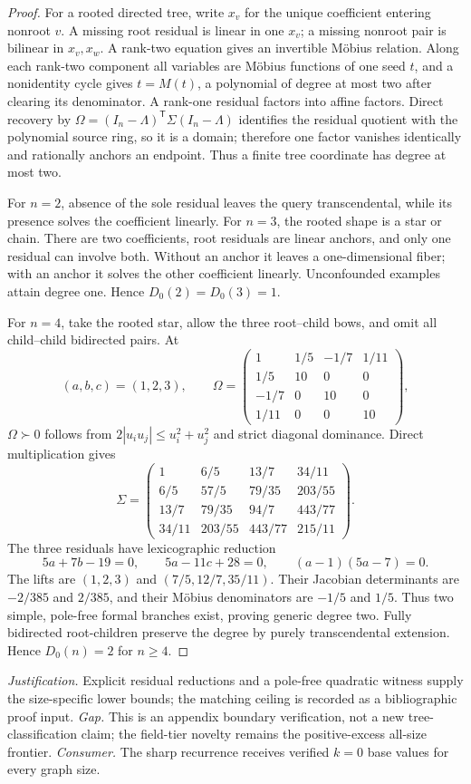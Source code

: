 \documentclass{article}
\begin{document}
\begin{proof}
For a rooted directed tree, write \(x_v\) for the unique coefficient entering nonroot \(v\). A missing root residual is linear in one \(x_v\); a missing nonroot pair is bilinear in \(x_v,x_w\). A rank-two equation gives an invertible Möbius relation. Along each rank-two component all variables are Möbius functions of one seed \(t\), and a nonidentity cycle gives \(t=M(t)\), a polynomial of degree at most two after clearing its denominator. A rank-one residual factors into affine factors. Direct recovery by \(\Omega=(I_n-\Lambda)^{\mathsf T}\Sigma(I_n-\Lambda)\) identifies the residual quotient with the polynomial source ring, so it is a domain; therefore one factor vanishes identically and rationally anchors an endpoint. Thus a finite tree coordinate has degree at most two.

For \(n=2\), absence of the sole residual leaves the query transcendental, while its presence solves the coefficient linearly. For \(n=3\), the rooted shape is a star or chain. There are two coefficients, root residuals are linear anchors, and only one residual can involve both. Without an anchor it leaves a one-dimensional fiber; with an anchor it solves the other coefficient linearly. Unconfounded examples attain degree one. Hence \(D_0(2)=D_0(3)=1\).

For \(n=4\), take the rooted star, allow the three root--child bows, and omit all child--child bidirected pairs. At
\[
(a,b,c)=(1,2,3),\qquad
\Omega=\begin{pmatrix}
1&1/5&-1/7&1/11\\
1/5&10&0&0\\
-1/7&0&10&0\\
1/11&0&0&10
\end{pmatrix},
\]
\(\Omega\succ0\) follows from \(2|u_iu_j|\le u_i^2+u_j^2\) and strict diagonal dominance. Direct multiplication gives
\[
\Sigma=\begin{pmatrix}
1&6/5&13/7&34/11\\
6/5&57/5&79/35&203/55\\
13/7&79/35&94/7&443/77\\
34/11&203/55&443/77&215/11
\end{pmatrix}.
\]
The three residuals have lexicographic reduction
\[
5a+7b-19=0,\qquad5a-11c+28=0,\qquad(a-1)(5a-7)=0.
\]
The lifts are \((1,2,3)\) and \((7/5,12/7,35/11)\). Their Jacobian determinants are \(-2/385\) and \(2/385\), and their Möbius denominators are \(-1/5\) and \(1/5\). Thus two simple, pole-free formal branches exist, proving generic degree two. Fully bidirected root-children preserve the degree by purely transcendental extension. Hence \(D_0(n)=2\) for \(n\ge4\).
\end{proof}
\par\smallskip\noindent \textit{Justification.} Explicit residual reductions and a pole-free quadratic witness supply the size-specific lower bounds; the matching ceiling is recorded as a bibliographic proof input. \textit{Gap.} This is an appendix boundary verification, not a new tree-classification claim; the field-tier novelty remains the positive-excess all-size frontier. \textit{Consumer.} The sharp recurrence receives verified \(k=0\) base values for every graph size.
\end{document}

